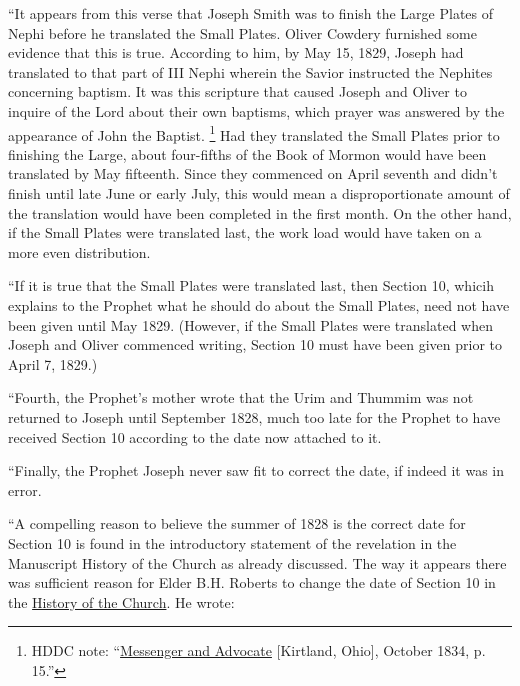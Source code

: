 			\noindent ``It appears from this verse that Joseph Smith was to finish the Large Plates of Nephi before he translated the Small Plates. Oliver Cowdery furnished some evidence that this is true. According to him, by May 15, 1829, Joseph had translated to that part of III Nephi wherein the Savior instructed the Nephites concerning baptism. It was this scripture that caused Joseph and Oliver to inquire of the Lord about their own baptisms, which prayer was answered by the appearance of John the Baptist.%
			\footnote{%
				HDDC note: ``\uline{Messenger and Advocate} [Kirtland, Ohio], October 1834, p. 15.'' 
				} 
			Had they translated the Small Plates prior to finishing the Large, about four-fifths of the Book of Mormon would have been translated by May fifteenth. Since they commenced on April seventh and didn't finish until late June or early July, this would mean a disproportionate amount of the translation would have been completed in the first month. On the other hand, if the Small Plates were translated last, the work load would have taken on a more even distribution.
			
			``If it is true that the Small Plates were translated last, then Section 10, whicih explains to the Prophet what he should do about the Small Plates, need not have been given until May 1829. (However, if the Small Plates were translated when Joseph and Oliver commenced writing, Section 10 must have been given prior to April 7, 1829.)
			
			``Fourth, the Prophet's mother wrote that the Urim and Thummim was not returned to Joseph until September 1828, much too late for the Prophet to have received Section 10 according to the date now attached to it.
			
			``Finally, the Prophet Joseph never saw fit to correct the date, if indeed it was in error.
			
			``A compelling reason to believe the summer of 1828 is the correct date for Section 10 is found in the introductory statement of the revelation in the Manuscript History of the Church as already discussed. The way it appears there was sufficient reason for Elder B.H. Roberts to change the date of Section 10 in the \uline{History of the Church}. He wrote: 
			
